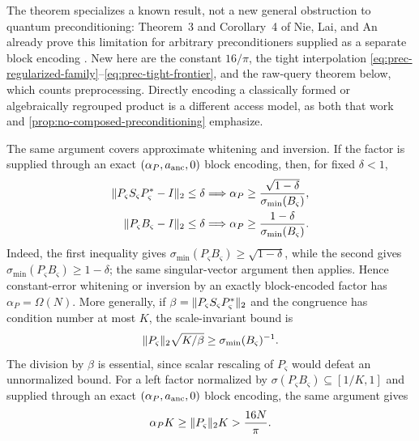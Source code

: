 The theorem specializes a known result, not a new general obstruction to
quantum preconditioning: Theorem~3 and Corollary~4 of Nie, Lai, and An
already prove this limitation for arbitrary preconditioners supplied as a
separate block encoding
\cite{hantao2026-pauli-structured-preconditioning-quantum-linear}.  New here
are the constant $16/\pi$, the tight interpolation
\eqref{eq:prec-regularized-family}--\eqref{eq:prec-tight-frontier}, and the
raw-query theorem below, which counts preprocessing.  Directly encoding a
classically formed or algebraically regrouped product is a different access
model, as both that work and \cref{prop:no-composed-preconditioning}
emphasize.

The same argument covers approximate whitening and inversion.  If the factor is
supplied through an exact $(\alpha_P,a_{\rm anc},0)$ block encoding, then, for fixed
$\delta<1$,
\begin{align}
 \lVert P_\varsigma S_\varsigma P_\varsigma^*-I\rVert_2\leq\delta
 &\Longrightarrow
 \alpha_P\geq
 \frac{\sqrt{1-\delta}}{\sigma_{\min}(B_\varsigma)},\label{eq:prec-approx-white}\\
 \lVert P_\varsigma B_\varsigma-I\rVert_2\leq\delta
 &\Longrightarrow
 \alpha_P\geq
 \frac{1-\delta}{\sigma_{\min}(B_\varsigma)}.\label{eq:prec-approx-inverse}
\end{align}
Indeed, the first inequality gives
$\sigma_{\min}(P_\varsigma B_\varsigma)\geq\sqrt{1-\delta}$, while the
second gives $\sigma_{\min}(P_\varsigma B_\varsigma)\geq1-\delta$; the same
singular-vector argument then applies.
Hence constant-error whitening or inversion by an exactly block-encoded
factor has $\alpha_P=\Omega(N)$.  More
generally, if $\beta=\lVert P_\varsigma S_\varsigma P_\varsigma^*\rVert_2$ and the
congruence has condition number at most $K$, the scale-invariant bound is
\begin{equation}
 \lVert P_\varsigma\rVert_2\sqrt{K/\beta}
 \geq\sigma_{\min}(B_\varsigma)^{-1}.          \label{eq:prec-scale-invariant}
\end{equation}
The division by $\beta$ is essential, since scalar rescaling of $P_\varsigma$
would defeat an unnormalized bound.  For a left factor normalized by
$\sigma(P_\varsigma B_\varsigma)\subseteq[1/K,1]$ and supplied through an
exact $(\alpha_P,a_{\rm anc},0)$ block encoding, the same argument gives
\begin{equation}
 \alpha_PK\geq\lVert P_\varsigma\rVert_2K>\frac{16N}{\pi}.       \label{eq:prec-left-frontier}
\end{equation}

